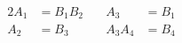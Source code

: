 \documentclass{book}
\begin{document}
\setcounter{chapter}{2}

\begin{alignat}{2}
A_{1} & =B_{1}B_{2}\quad & A_{3} & =B_{1}\\
A_{2} & =B_{3} & A_{3}A_{4} & =B_{4}
\end{alignat}
\end{document}
